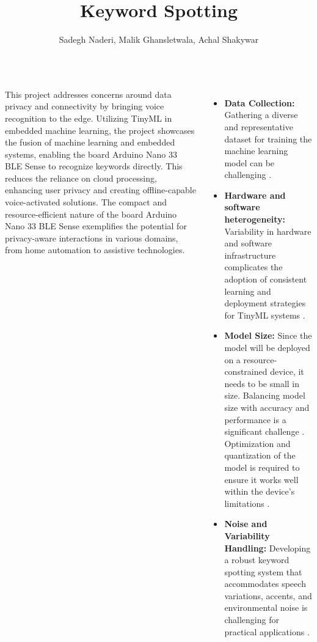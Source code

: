 \documentclass[25pt,a0paper, portrait]{tikzposter}
\title{Keyword Spotting}
\author{Sadegh Naderi, Malik Ghansletwala, Achal Shakywar}
\begin{document}
	
	\maketitle
	
	\begin{columns} 
		
		{
			{
				
				This project addresses concerns around data privacy and connectivity by bringing voice recognition to the edge. Utilizing TinyML in embedded machine learning, the project showcases the fusion of machine learning and embedded systems, enabling the board Arduino Nano 33 BLE Sense to recognize keywords directly. This reduces the reliance on cloud processing, enhancing user privacy and creating offline-capable voice-activated solutions. The compact and resource-efficient nature of the board Arduino Nano 33 BLE Sense exemplifies the potential for privacy-aware interactions in various domains, from home automation to assistive technologies.
				
				
				
			}
		}
		
		{
			
			\begin{itemize}
				\item \textbf{Data Collection:} Gathering a diverse and representative dataset for training the machine learning model can be challenging \cite{Nabaz:2023}.
				
				\item \textbf{Hardware and software heterogeneity:} Variability in hardware and software infrastructure complicates the adoption of consistent learning and deployment strategies for TinyML systems \cite{Ray:2022}.
				
				\item \textbf{Model Size:} Since the model will be deployed on a resource-constrained device, it needs to be small in size. Balancing model size with accuracy and performance is a significant challenge \cite{Abbas:2023}. Optimization and quantization of the model is required to ensure it works well within the device's limitations \cite{Ray:2022}.
				\item\textbf{Noise and Variability Handling:} Developing a robust keyword spotting system that accommodates speech variations, accents, and environmental noise is challenging for practical applications \cite{Warden:2018}.
			\end{itemize}
			
}
\end{columns}
\end{document}
